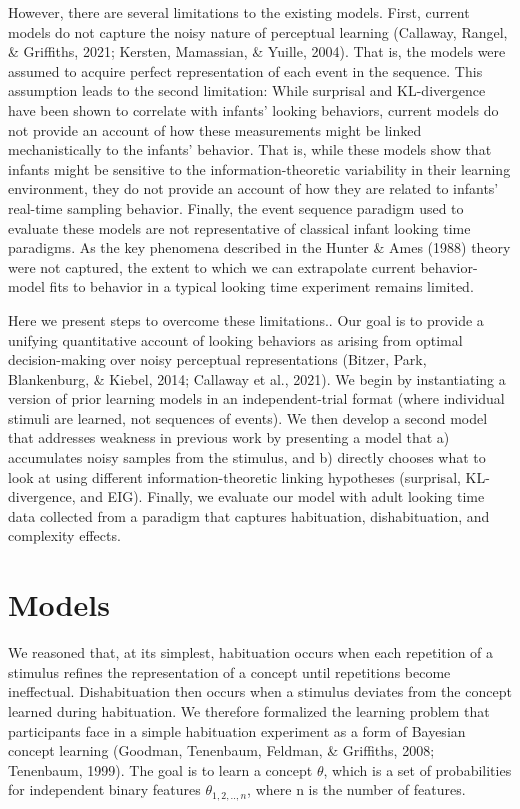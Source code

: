 \documentclass[10pt, letterpaper]{article}
\begin{document}
However, there are several limitations to the existing models. First,
current models do not capture the noisy nature of perceptual learning
(Callaway, Rangel, \& Griffiths, 2021; Kersten, Mamassian, \& Yuille,
2004). That is, the models were assumed to acquire perfect
representation of each event in the sequence. This assumption leads to
the second limitation: While surprisal and KL-divergence have been shown
to correlate with infants' looking behaviors, current models do not
provide an account of how these measurements might be linked
mechanistically to the infants' behavior. That is, while these models
show that infants might be sensitive to the information-theoretic
variability in their learning environment, they do not provide an
account of how they are related to infants' real-time sampling behavior.
Finally, the event sequence paradigm used to evaluate these models are
not representative of classical infant looking time paradigms. As the
key phenomena described in the Hunter \& Ames (1988) theory were not
captured, the extent to which we can extrapolate current behavior-model
fits to behavior in a typical looking time experiment remains limited.

Here we present steps to overcome these limitations.. Our goal is to
provide a unifying quantitative account of looking behaviors as arising
from optimal decision-making over noisy perceptual representations
(Bitzer, Park, Blankenburg, \& Kiebel, 2014; Callaway et al., 2021). We
begin by instantiating a version of prior learning models in an
independent-trial format (where individual stimuli are learned, not
sequences of events). We then develop a second model that addresses
weakness in previous work by presenting a model that a) accumulates
noisy samples from the stimulus, and b) directly chooses what to look at
using different information-theoretic linking hypotheses (surprisal,
KL-divergence, and EIG). Finally, we evaluate our model with adult
looking time data collected from a paradigm that captures habituation,
dishabituation, and complexity effects.

\hypertarget{models}{%
\section{Models}\label{models}}

We reasoned that, at its simplest, habituation occurs when each
repetition of a stimulus refines the representation of a concept until
repetitions become ineffectual. Dishabituation then occurs when a
stimulus deviates from the concept learned during habituation. We
therefore formalized the learning problem that participants face in a
simple habituation experiment as a form of Bayesian concept learning
(Goodman, Tenenbaum, Feldman, \& Griffiths, 2008; Tenenbaum, 1999). The
goal is to learn a concept \(\theta\), which is a set of probabilities
for independent binary features \(\theta_{1,2,..,n}\), where n is the
number of features.
\end{document}
